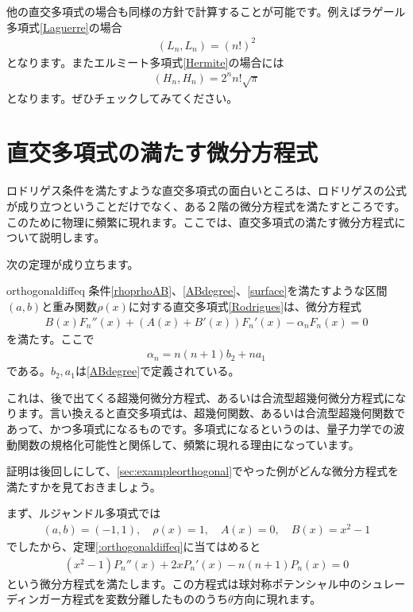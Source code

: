 \documentclass[report,paper=a4, fontsize=12pt, line_length=16cm, number_of_lines=33,dvipdfmx]{jlreq}
\numberwithin{equation}{section}
\begin{document}
他の直交多項式の場合も同様の方針で計算することが可能です。例えばラゲール多項式\eqref{Laguerre}の場合
\begin{align}
  (L_n,L_n)=(n!)^2
\end{align}
となります。またエルミート多項式\eqref{Hermite}の場合には
\begin{align}
  (H_n,H_n)=2^n n!\sqrt{\pi}
\end{align}
となります。ぜひチェックしてみてください。

\section{直交多項式の満たす微分方程式}
ロドリゲス条件を満たすような直交多項式の面白いところは、ロドリゲスの公式が成り立つということだけでなく、ある２階の微分方程式を満たすところです。このために物理に頻繁に現れます。ここでは、直交多項式の満たす微分方程式について説明します。

次の定理が成り立ちます。
\begin{theor}{}{orthogonaldiffeq}
  条件\eqref{rhoprhoAB}、\eqref{ABdegree}、\eqref{surface}を満たすような区間$(a,b)$と重み関数$\rho(x)$に対する直交多項式\eqref{Rodrigues}は、微分方程式
  \begin{align}
    B(x)F_n''(x)+(A(x)+B'(x))F_n'(x)-\alpha_n F_n(x)=0\label{orthogonaldiffeq}
  \end{align}
  を満たす。ここで
  \begin{align}
    \alpha_n=n(n+1)b_2+na_1
  \end{align}
  である。$b_2,a_1$は\eqref{ABdegree}で定義されている。
\end{theor}
これは、後で出てくる超幾何微分方程式、あるいは合流型超幾何微分方程式になります。言い換えると直交多項式は、超幾何関数、あるいは合流型超幾何関数であって、かつ多項式になるものです。多項式になるというのは、量子力学での波動関数の規格化可能性と関係して、頻繁に現れる理由になっています。

証明は後回しにして、\ref{sec:exampleorthogonal}でやった例がどんな微分方程式を満たすかを見ておきましょう。

まず、ルジャンドル多項式では
\begin{align}
  (a,b)=(-1,1),\quad \rho(x)=1,\quad A(x)=0,\quad B(x)=x^2-1
\end{align}
でしたから、定理\ref{:orthogonaldiffeq}に当てはめると
\begin{align}
  (x^2-1)P_n''(x)+2x P_n'(x)-n(n+1)P_n(x)=0
\end{align}
という微分方程式を満たします。この方程式は球対称ポテンシャル中のシュレーディンガー方程式を変数分離したもののうち$\theta$方向に現れます。
\end{document}
